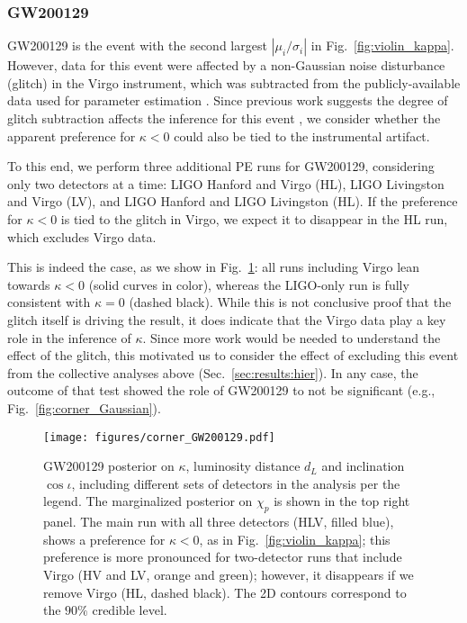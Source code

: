 \documentclass[aps,prd,twocolumn,superscriptaddress,preprintnumbers,nofootinbib]{revtex4-2}
\begin{document}
\subsubsection{GW200129}
\label{sec:GW200129}

GW200129 is the event with the second largest $|\mu_i/\sigma_i|$ in Fig.~\ref{fig:violin_kappa}.
However, data for this event were affected by a non-Gaussian noise disturbance (glitch) in the Virgo instrument, which was subtracted from the publicly-available data used for parameter estimation \cite{Davis:2022ird}.
Since previous work suggests the degree of glitch subtraction affects the inference for this event \citep{GW200129_glitch}, we consider whether the apparent preference for $\kappa < 0$ could also be tied to the instrumental artifact.

To this end, we perform three additional \ac{PE} runs for GW200129, considering only two detectors at a time: LIGO Hanford and Virgo (HL), LIGO Livingston and Virgo (LV), and LIGO Hanford and LIGO Livingston (HL).
If the preference for $\kappa < 0$ is tied to the glitch in Virgo, we expect it to disappear in the HL run, which excludes Virgo data.

This is indeed the case, as we show in Fig.~\ref{fig:corner_GW200129}: all runs including Virgo lean towards $\kappa < 0$ (solid curves in color), whereas the LIGO-only run is fully consistent with $\kappa = 0$ (dashed black).
While this is not conclusive proof that the glitch itself is driving the result, it does indicate that the Virgo data play a key role in the inference of $\kappa$.
Since more work would be needed to understand the effect of the glitch, this motivated us to consider the effect of excluding this event from the collective analyses above (Sec.~\ref{sec:results:hier}).
In any case, the outcome of that test showed the role of GW200129 to not be significant (e.g., Fig.~\ref{fig:corner_Gaussian}).

\begin{figure}
    \texttt{[image: figures/corner\_GW200129.pdf]}
    \caption{
        GW200129 posterior on $\kappa$, luminosity distance $d_L$ and inclination $\cos{\iota}$, including different sets of detectors in the analysis per the legend.
        The marginalized posterior on $\chi_p$ is shown in the top right panel.
        The main run with all three detectors (HLV, filled blue), shows a preference for $\kappa < 0$, as in Fig.~\ref{fig:violin_kappa}; this preference is more pronounced for two-detector runs that include Virgo (HV and LV, orange and green); however, it disappears if we remove Virgo (HL, dashed black).
        The 2D contours correspond to the $90\%$ credible level.
    }
    \label{fig:corner_GW200129}
\end{figure}
\end{document}
